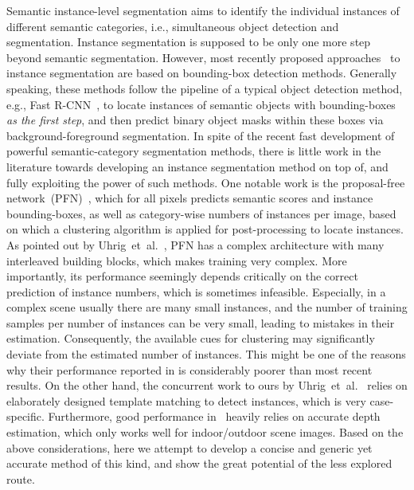 \documentclass{article}
\begin{document}
Semantic instance-level segmentation aims to identify the individual instances of different semantic categories,
i.e., simultaneous object detection and segmentation.
Instance segmentation is supposed to be  only one more step beyond semantic segmentation.
However, most recently proposed approaches~\cite{SDS.ECCV.2014.Hariharan,HyperColumn.CVPR.2015.Hariharan,MNC.CVPR.2016.Dai} to instance segmentation are based on bounding-box detection methods.
Generally speaking, these methods follow the pipeline of a typical object detection method,
e.g., Fast R-CNN~\cite{FastRCNN.ICCV.2015.Girshick},
to locate instances of semantic objects with bounding-boxes {\em as the first step},
and then predict binary object masks within these boxes via background-foreground segmentation.
In spite of the recent fast development of powerful semantic-category segmentation methods,
there is little work in the literature towards developing an instance segmentation method on top of, and fully exploiting the power of such
methods.
One notable work is the proposal-free network~(PFN)~\cite{ProposalFree.2015.Liang},
which for all pixels predicts semantic scores and instance bounding-boxes, as well as category-wise numbers of instances per image,
based on which a clustering algorithm is applied for post-processing to locate instances.
As pointed out by Uhrig~et~al.~\cite{CityscapesInstance.2016.Uhrig},
PFN has a complex architecture with many interleaved building blocks, which makes training very complex.
More importantly, its performance seemingly depends critically on the correct prediction of instance numbers,
which is sometimes infeasible. Especially, in a complex scene usually there are many small instances, and
the number of training samples per number of instances can be very small,
leading to mistakes in their estimation. Consequently, the available cues for
clustering may significantly deviate from the estimated number of instances.
This might be one of the reasons why
their performance reported in \cite{ProposalFree.2015.Liang} is considerably poorer than most recent results.
On the other hand, the concurrent work to ours by Uhrig~et~al.~\cite{CityscapesInstance.2016.Uhrig} relies on elaborately designed template matching to detect instances,
which is very case-specific. Furthermore, good performance in~\cite{CityscapesInstance.2016.Uhrig} heavily
relies on  accurate depth estimation, which only works well   for indoor/outdoor scene images.
Based on the above considerations,
here we attempt to develop a concise and generic yet accurate method of this kind,
and show the great potential of the less explored route.
\end{document}
